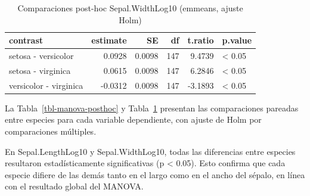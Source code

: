 \documentclass[
  spanish,
  11pt,
  a4paper,
  DIV=11,
  numbers=noendperiod]{scrartcl}
\begin{document}
\begin{longtable}[]{@{}lrrrrl@{}}

\caption{\label{tbl-manova-posthoc2}Comparaciones post-hoc
Sepal.WidthLog10 (emmeans, ajuste Holm)}

\tabularnewline

\toprule\noalign{}
contrast & estimate & SE & df & t.ratio & p.value \\
\midrule\noalign{}
\endhead
\bottomrule\noalign{}
\endlastfoot
setosa - versicolor & 0.0928 & 0.0098 & 147 & 9.4739 & \textless{}
0.05 \\
setosa - virginica & 0.0615 & 0.0098 & 147 & 6.2846 & \textless{}
0.05 \\
versicolor - virginica & -0.0312 & 0.0098 & 147 & -3.1893 & \textless{}
0.05 \\

\end{longtable}

La Tabla~\ref{tbl-manova-posthoc} y Tabla~\ref{tbl-manova-posthoc2}
presentan las comparaciones pareadas entre especies para cada variable
dependiente, con ajuste de Holm por comparaciones múltiples.

En Sepal.LengthLog10 y Sepal.WidthLog10, todas las diferencias entre
especies resultaron estadísticamente significativas (p \textless{}
0.05). Esto confirma que cada especie difiere de las demás tanto en el
largo como en el ancho del sépalo, en línea con el resultado global del
MANOVA.
\end{document}
